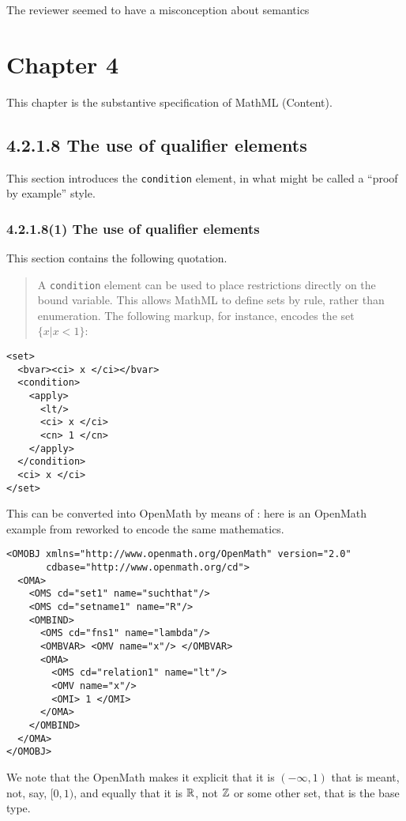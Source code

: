 \documentclass{llncs}
\begin{document}
\begin{newpart}{The reviewer seemed to have a misconception about semantics}
\section{Chapter 4}
This chapter is the substantive specification of MathML (Content).
\subsection{4.2.1.8 The use of qualifier elements}\label{4218}
This section introduces the {\tt condition} element, in what might be called a
``proof by example'' style.
\subsubsection{4.2.1.8(1) The use of qualifier elements}\label{42181}
This section contains the following quotation.
\begin{quotation}\noindent
A {\tt condition} element can be used to place restrictions directly on the
bound variable. This allows MathML to define sets by rule, rather than
enumeration. The following markup, for instance, encodes the set $\{x | x <
1\}$: 
\end{quotation}
\begin{lstlisting}[language=MathML2]
<set>
  <bvar><ci> x </ci></bvar>
  <condition>
    <apply>
      <lt/>
      <ci> x </ci>
      <cn> 1 </cn>
    </apply>
  </condition>
  <ci> x </ci>
</set>
\end{lstlisting}
This can be converted into OpenMath by means of {}: here is an
OpenMath example from {} reworked to encode the same mathematics.
\begin{lstlisting}
<OMOBJ xmlns="http://www.openmath.org/OpenMath" version="2.0"
       cdbase="http://www.openmath.org/cd">
  <OMA>
    <OMS cd="set1" name="suchthat"/>
    <OMS cd="setname1" name="R"/>
    <OMBIND>
      <OMS cd="fns1" name="lambda"/>
      <OMBVAR> <OMV name="x"/> </OMBVAR>
      <OMA>
        <OMS cd="relation1" name="lt"/>
        <OMV name="x"/>
        <OMI> 1 </OMI>
      </OMA>
    </OMBIND>
  </OMA>
</OMOBJ>
\end{lstlisting}
We note that the OpenMath makes it explicit that it is $(-\infty,1)$ that is
meant, not, say, $[0,1)$, and equally that it is $\mathbb{R}$, not $\mathbb{Z}$ or some other
set, that is the base type.

\end{newpart}
\end{document}
